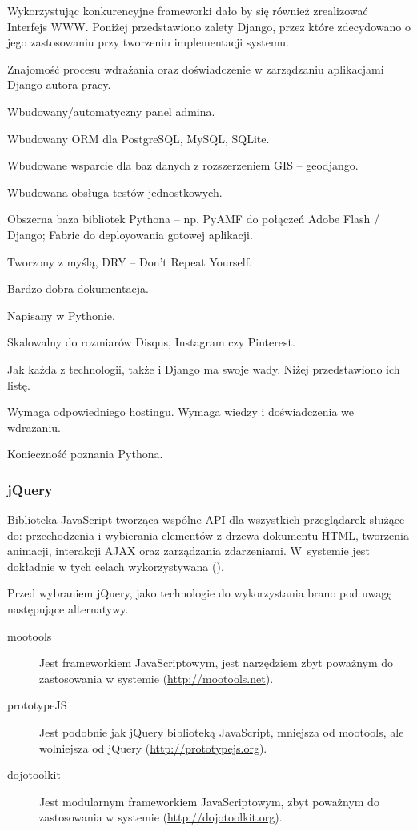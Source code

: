 Wykorzystując konkurencyjne frameworki dało by się również zrealizować Interfejs WWW. Poniżej przedstawiono zalety Django, przez które zdecydowano o jego zastosowaniu przy tworzeniu implementacji systemu.
\begin{packed_item}
    \item{Znajomość procesu wdrażania oraz doświadczenie w zarządzaniu aplikacjami Django autora pracy.}
    \item{Wbudowany/automatyczny panel admina.}
    \item{Wbudowany ORM dla PostgreSQL, MySQL, SQLite.}
    \item{Wbudowane wsparcie dla baz danych z rozszerzeniem GIS -- geodjango.}
    \item{Wbudowana obsługa testów jednostkowych.}
    \item{Obszerna baza bibliotek Pythona -- np. PyAMF do połączeń Adobe Flash / Django; Fabric do deployowania gotowej aplikacji.}
    \item{Tworzony z myślą, DRY -- Don't Repeat Yourself.}
    \item{Bardzo dobra dokumentacja.}
    \item{Napisany w Pythonie.}
    \item{Skalowalny do rozmiarów Disqus, Instagram czy Pinterest.}
\end{packed_item}

Jak każda z technologii, także i Django ma swoje wady. Niżej przedstawiono ich listę.
\begin{packed_item}
    \item{Wymaga odpowiedniego hostingu. Wymaga wiedzy i doświadczenia we wdrażaniu.}
    \item{Konieczność poznania Pythona.}
\end{packed_item}

\newpage
\subsubsection{jQuery}
Biblioteka JavaScript tworząca wspólne API dla wszystkich przeglądarek służące do: przechodzenia i wybierania elementów z drzewa dokumentu HTML, tworzenia animacji, interakcji AJAX oraz zarządzania zdarzeniami. W~systemie jest dokładnie w tych celach wykorzystywana (\cite{jQuery}).

Przed wybraniem jQuery, jako technologie do wykorzystania brano pod uwagę następujące alternatywy.
\begin{description}
    \item[mootools] Jest frameworkiem JavaScriptowym, jest narzędziem zbyt poważnym do zastosowania w systemie (\url{http://mootools.net}).
    \item[prototypeJS] Jest podobnie jak jQuery biblioteką JavaScript, mniejsza od mootools, ale wolniejsza od jQuery (\url{http://prototypejs.org}).
    \item[dojotoolkit] Jest modularnym frameworkiem JavaScriptowym, zbyt poważnym do zastosowania w systemie (\url{http://dojotoolkit.org}).
\end{description}

